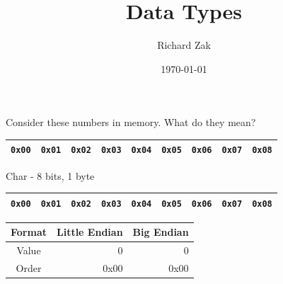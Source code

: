 \documentclass{beamer}
\title{Data Types}
\author{Richard Zak}
\institute{UMBC}
\date{\today}
\begin{document}

\begin{frame}
Consider these numbers in memory. What do they mean?
\begin{table}[]
\begin{tabular}{|l|l|l|l|l|l|l|l|l|}
\hline
 \texttt{0x00} & \texttt{0x01} & \texttt{0x02} & \texttt{0x03} & \texttt{0x04} & \texttt{0x05} & \texttt{0x06} & \texttt{0x07} &
 \texttt{0x08} \\
\hline 
\end{tabular}
\end{table}
\end{frame}

\begin{frame}{Char - 8 bits, 1 byte}

\begin{table}[]
\begin{tabular}{|l|l|l|l|l|l|l|l|l|}
\hline
 \color{red}\texttt{0x00} & \texttt{0x01} & \texttt{0x02} & \texttt{0x03} & \texttt{0x04} & \texttt{0x05} & \texttt{0x06} & \texttt{0x07} &
 \texttt{0x08} \\
\hline 
\end{tabular}
\end{table}

\begin{table}[]
\begin{tabular}{c r r}
Format & Little Endian & Big Endian \\
\hline
Value &  0   & 0 \\
Order & 0x00 & 0x00
\end{tabular}
\end{table}

\end{frame}
\end{document}
